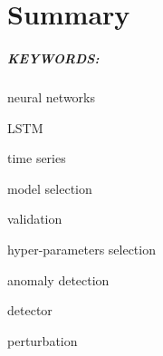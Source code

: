%

\chapter*{Summary}\label{ch:summary}
 
\paragraph{KEYWORDS:}
\begin{itemize*}[label=,itemsep=1em,itemjoin=\hspace{1em}]
  \item neural networks
  \item LSTM
  \item time series
  \item model selection
  \item validation
  \item hyper-parameters selection
  \item anomaly detection
  \item detector
  \item perturbation
\end{itemize*}

\endinput
